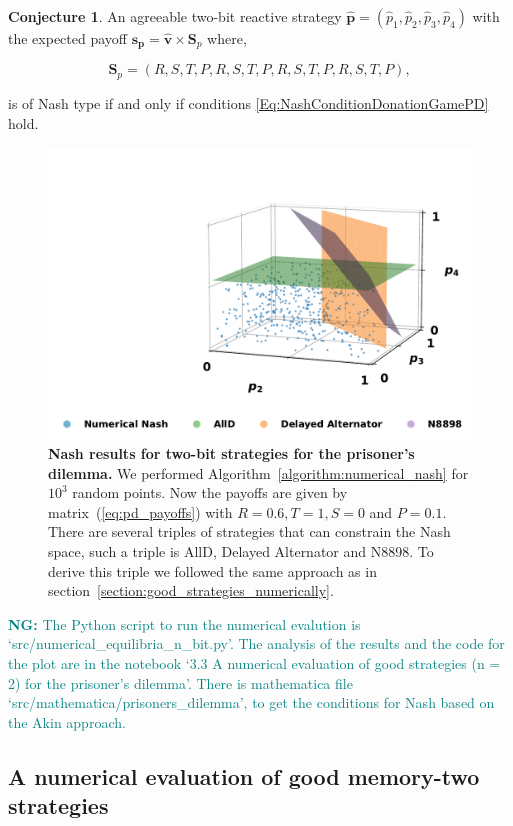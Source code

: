 \documentclass{article}
\theoremstyle{definition}
\newtheorem{conjecture}[theorem]{Conjecture}
\newcommand{\nikoleta}[1]{\textcolor{teal}{{\bf NG:} #1}}
\begin{document}
\begin{conjecture}\label{conjecture:nash_from_numerical_results_pd}
An agreeable two-bit reactive strategy \(\mathbf{\hat{p}} = (\hat{p}_{1}, \hat{p}_{2}, \hat{p}_{3}, \hat{p}_{4})\)
with the expected payoff \(\mathbf{s_{p}} = \mathbf{\hat{v}} \times \mathbf{S}_{p}\) where,

\[\mathbf{S}_{p} = (R, S, T, P, R, S, T, P, R, S, T, P, R, S, T, P),\]

is of Nash type if and only if conditions \eqref{Eq:NashConditionDonationGamePD} hold.
\end{conjecture}

\begin{figure}[!htbp]
  \centering
  \includegraphics[width=.55\textwidth]{static/two_bit_reactive_numerical_results_prisoners_dilemma.pdf}
  \caption{\textbf{Nash results for two-bit strategies for the prisoner's dilemma.}
  We performed Algorithm~\ref{algorithm:numerical_nash} for \(10 ^ 3\) random
  points. Now the payoffs are given by matrix~(\ref{eq:pd_payoffs})
  with \(R=0.6, T=1, S=0\) and \(P=0.1\). There are several triples of
  strategies that can constrain the Nash space, such a triple is AllD, Delayed
  Alternator and N8898. To derive this triple we followed the same approach as
  in section~\ref{section:good_strategies_numerically}.}
  \label{fig:numerical_results_prisoners_dilemma}
\end{figure}

\nikoleta{The Python script to run the numerical evalution is
`src/numerical\_equilibria\_n\_bit.py'. The analysis of the results and the code
for the plot are in the notebook `3.3 A numerical evaluation of good strategies
(n = 2) for the prisoner's dilemma'. There is mathematica file
`src/mathematica/prisoners\_dilemma', to get the conditions for Nash based on
the Akin approach.}

\subsection{A numerical evaluation of good memory-two strategies}\label{section:good_strategies_numerically_mem_two}
\end{document}
